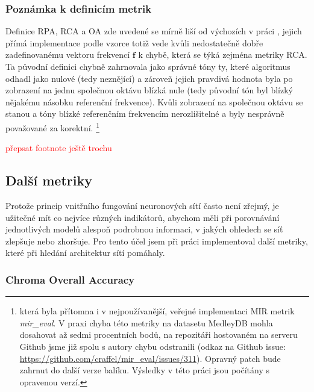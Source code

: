 

\subsubsection{Poznámka k definicím metrik}

Definice RPA, RCA a OA zde uvedené se mírně liší od výchozích v práci \cite{Salamon2014}, jejich přímá implementace podle vzorce totiž vede kvůli nedostatečně dobře zadefinovanému vektoru frekvencí $\mathbf{f}$ k chybě, která se týká zejména metriky RCA. Ta původní definici chybně zahrnovala jako správné tóny ty, které algoritmus odhadl jako nulové (tedy neznějící) a zároveň jejich pravdivá hodnota byla po zobrazení na jednu společnou oktávu blízká nule (tedy původní tón byl blízký nějakému násobku referenční frekvence). Kvůli zobrazení na společnou oktávu se stanou  a tóny blízké referenčním frekvencím nerozlišitelné a byly nesprávně považované za korektní. \footnote{
    která byla přítomna i v nejpoužívanější, veřejné implementaci MIR metrik \textit{mir\_eval}. V praxi chyba této metriky na datasetu MedleyDB mohla dosahovat až sedmi procentních bodů, na repozitáři hostovaném na serveru Github jsme již spolu s autory chybu odstranili (odkaz na Github issue: \url{https://github.com/craffel/mir_eval/issues/311}). Opravný patch bude zahrnut do další verze balíku. Výsledky v této práci jsou počítány s opravenou verzí.}

\textcolor{red}{přepsat footnote ještě trochu}
% 

\subsection{Další metriky}

Protože princip vnitřního fungování neuronových sítí často není zřejmý, je užitečné mít co nejvíce různých indikátorů, abychom měli při porovnávání jednotlivých modelů alespoň podrobnou informaci, v jakých ohledech se síť zlepšuje nebo zhoršuje. Pro tento účel jsem při práci implementoval další metriky, které při hledání architektur sítí pomáhaly.

\subsubsection{Chroma Overall Accuracy}

